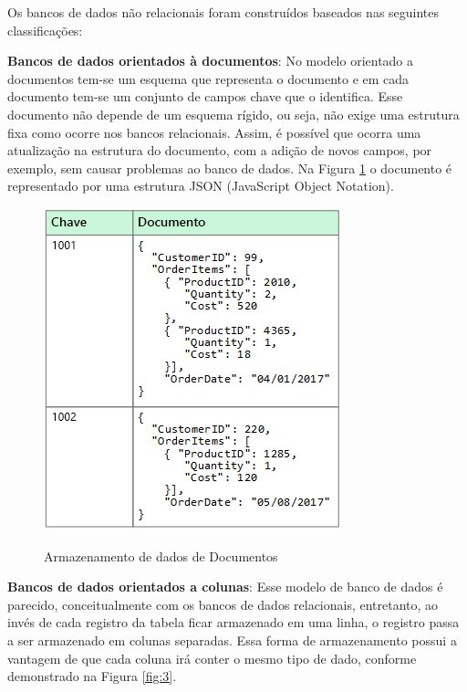 Os bancos de dados não relacionais foram construídos baseados nas seguintes classificações: 
\begin{compactitem}
	\item \textbf{Bancos de dados orientados à documentos}: No modelo orientado a documentos tem-se um esquema que representa o documento e em cada documento tem-se um conjunto de campos chave que o identifica. Esse documento não depende de um esquema rígido, ou seja, não exige uma estrutura fixa como ocorre nos bancos relacionais. Assim, é possível que ocorra uma atualização na estrutura do documento, com a adição de novos campos, por exemplo, sem causar problemas ao banco de dados. Na Figura \ref{fig:2} o documento é representado por uma estrutura JSON (JavaScript Object Notation).  
	
\begin{figure}[H]
  \setlength{\abovecaptionskip}{0pt}
  \setlength{\belowcaptionskip}{0pt}
  \caption[Banco de dados de Documentos]{Armazenamento de dados de Documentos}
  \centering
  \includegraphics[width=.65\textwidth]{imagem/NoSQL_Document.png}
  \captionsetup{justification=centering}
  \label{fig:2}
\end{figure}
    
    \item \textbf{Bancos de dados orientados a colunas}: Esse modelo de banco de dados é parecido, conceitualmente com os bancos de dados relacionais, entretanto, ao invés de cada registro da tabela ficar armazenado em uma linha, o registro passa a ser armazenado em colunas separadas. Essa forma de armazenamento possui a vantagem de que cada coluna irá conter o mesmo tipo de dado, conforme demonstrado na Figura \ref{fig:3}. 
    

\end{compactitem}
